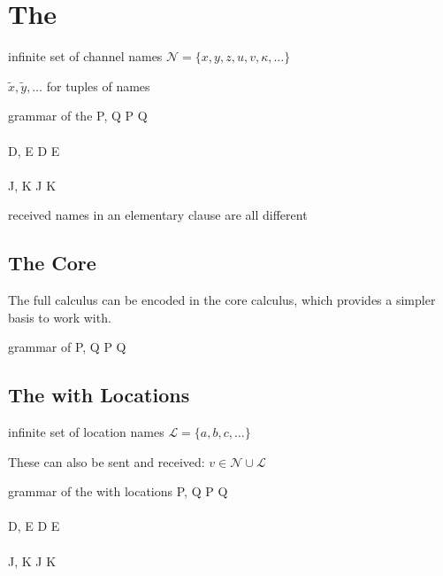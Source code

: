\section{The \JoinCalc}

infinite set of channel names
$ \mathcal{N} = \{ x, y, z, u, v, \kappa, \ldots \} $

$ \tilde{x}, \tilde{y}, \ldots $ for tuples of names

\begin{JDef}{grammar of the \joincalc}
  P, Q
  \grmr {}
  \altn {}
  \altn P \jpar Q
  \altn \jnullproc
  \\ \\
  D, E
  \grmr {}
  \altn D \jcon E
  \altn \jnulldef
  \\ \\
  J, K
  \grmr {}
  \altn J \jpat K
\end{JDef}

received names in an elementary clause are all different


\subsection{The Core \JoinCalc}

The full calculus can be encoded in the core calculus,
which provides a simpler basis to work with.

\begin{JDef}{grammar of \monadicjoincalc}
  P, Q
  \grmr {}
  \altn P \jpar Q
  \altn {}
\end{JDef}


\subsection{The \JoinCalc with Locations}

infinite set of location names
$ \mathcal{L} = \{ a, b, c, \ldots \} $

These can also be sent and received:
$ v \in \mathcal{N} \cup \mathcal{L} $


\begin{JDef}{grammar of the \joincalc with locations}
  P, Q
  \grmr {}
  \altn {}
  \altn P \jpar Q
  \altn \jnullproc
  \altn {}
  \\ \\
  D, E
  \grmr {}
  \altn D \jcon E
  \altn \jnulldef
  \altn {}
  \\ \\
  J, K
  \grmr {}
  \altn J \jpat K
\end{JDef}

